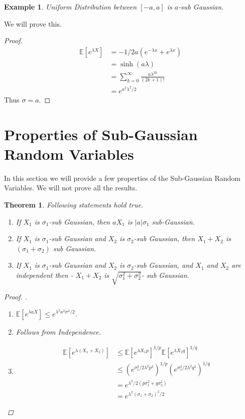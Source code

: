 \documentclass[10pt]{article}
\newcounter{lecnum}
\newtheorem{theorem}{Theorem}[lecnum]
\newtheorem{example}[ex]{Example}
\begin{document}
	\begin{example} 
		Uniform Distribution between $[-a, a]$ is $a$-sub Gaussian.	
	\end{example}
	
	We will prove this.
	\begin{proof}
		\begin{align*} 
		\mathbb{E}[e^{\lambda X}] &=  -1/2a(e^{-\lambda x} + e^{\lambda x}) \\
		&= \sinh(a\lambda) \\
		&= \sum_{k=0}^{\infty} \frac{a \lambda^{2k}}{(2k + 1)!} \\
		&= e^{a^{2}\lambda^{2}/2}
		\end{align*}
		Thus $\sigma = a$.
	\end{proof}
	
	\section{Properties of Sub-Gaussian Random Variables}
	In this section we will provide a few properties of the Sub-Gaussian Random Variables. We will not prove all the results.
	\begin{theorem} Following statements hold true.
		\begin{enumerate}
			\item 	If $X_1$ is $\sigma_1$-sub Gaussian, then $aX_1$ is $|a|\sigma_1$ sub-Gaussian.
			\item If $X_1$ is $\sigma_1$-sub Gaussian and $X_2$ is $\sigma_2$-sub Gaussian, then $X_1 + X_2$ is $(\sigma_1 + \sigma_2)$ sub Gaussian.
			
			\item  If $X_1$ is $\sigma_1$-sub Gaussian and $X_2$ is $\sigma_2$-sub Gaussian, and $X_1$ and $X_2$ are independent then - $X_1 + X_2$ is $\sqrt{\sigma_1^{2} + \sigma_2^{2}}$- sub Gaussian.
		\end{enumerate}
	
	\begin{proof}. 
		\begin{enumerate}
			\item $\mathbb{E}[e^{\lambda a X}] \le e^{\lambda^2 a^2 \sigma^2 /2}$.
			\item Follows from Independence.
			\item
			\begin{align*}
			\mathbb{E}[e^{\lambda(X_1 + X_2)}] &\le \mathbb{E}[e^{\lambda X_1 p}]^{1/p} \mathbb{E}[e^{\lambda X_2 q}]^{1/q} \\
							&\le (e^{\sigma_1^2/2 \lambda^2 p^2})^{1/p} (e^{\sigma_1^2/2 \lambda^2 q^2})^{1/q}\\
							&= e^{\lambda^2/2 (p \sigma_1^2 + q \sigma_2^{2} )}\\
							&= e^{\lambda^2 (\sigma_1 +  \sigma_2)^2/2}
			\end{align*}

		\end{enumerate}
	\end{proof}
	
	\end{theorem}
\end{document}
